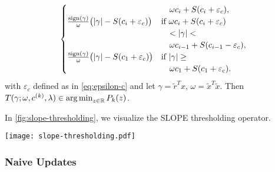 \begin{theorem}
\[\begin{multlined}
\begin{cases}
                                                                                     & \quad \omega c_i + S(c_i + \varepsilon_c),               \\
        \frac{\sign(\gamma)}{\omega} \big( |\gamma| - S(c_i + \varepsilon_c) \big)   & \text{if } \omega c_i + S(c_i + {\varepsilon_c})         \\
                                                                                     & \quad < |\gamma| <                                       \\
                                                                                     & \quad \omega c_{i - 1} + S(c_{i - 1} - {\varepsilon_c}), \\
        \frac{\sign(\gamma)}{\omega} \big( |\gamma| - S(c_1 + {\varepsilon_c}) \big) & \text{if } |\gamma| \geq                                 \\
                                                                                     & \quad \omega c_1 + S(c_1 + {\varepsilon_c}).
      \end{cases}
    \end{multlined}
  \]
  with \({\varepsilon_c}\) defined as in \eqref{eq:epsilon-c} and let
  \(\gamma = \tilde{r}^Tx\), \(\omega = \tilde{x}^T\tilde{x}\). Then
  \(T(\gamma; \omega, c^{(k)}, \lambda) \in \operatorname*{arg\,min}_{z \in \mathbb{R}} P_k(z)\).
\end{theorem}


In \cref{fig:slope-thresholding}, we visualize the SLOPE thresholding operator.

\begin{figure*}[htb]
  \centering
  \texttt{[image: slope-thresholding.pdf]}
  \caption{%
  An example of the SLOPE thresholding operator. The result corresponds to an
  example for \(\beta = [0.5, -0.5, 0.3, 0.7]^T\), \(c = [0.7, 0.5, 0.3]^T\)
  with an update for the second cluster (\(k = 2\)), such that
  \(c^{\setminus k} = [0.5, 0.3]^T\). Across regions where the function is constant,
      the operator sets the result to be either exactly 0 or to the value of one
      of the elements of \(c^{\setminus k}\).
    }
  \label{fig:slope-thresholding}
\end{figure*}

\subsubsection{Naive Updates}

